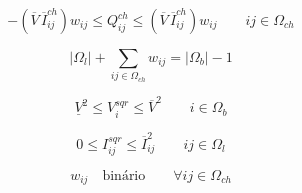     
\begin{equation*}
    -(\overline{V}\,\overline{I}_{ij}^{ch})w_{ij} \leq Q_{ij}^{ch} \leq (\overline{V}\,\overline{I}_{ij}^{ch})w_{ij}\qquad ij\in\Omega_{ch}   
\end{equation*}
    
\begin{equation*}
    |\Omega_{l}| + \sum_{ij\in\Omega_{ch}}w_{ij} = |\Omega_{b}| - 1
\end{equation*}

\begin{equation*}
    \underline{V}^{2} \leq V_{i}^{sqr} \leq \overline{V}^{2}\qquad i \in\Omega_{b}
\end{equation*}

\begin{equation*}
    0 \leq I_{ij}^{sqr} \leq \overline{I}_{ij}^{2} \qquad ij\in\Omega_{l} 
\end{equation*}

\begin{equation*}
    w_{ij}\quad\text{binário}\qquad\forall ij \in\Omega_{ch}
\end{equation*}